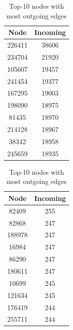 \documentclass[acmlarge]{acmart}
\begin{document}
  \begin{table}[h!]
    \centering
    \begin{minipage}{0.45\textwidth}
      \centering
      \begin{tabular}{|c|c|}
        \hline
        \textbf{Node} & \textbf{Incoming} \\ \hline
        226411 & 38606\\ \hline
        234704 & 21920\\ \hline
        105607 & 19457\\ \hline
        241454 & 19377\\ \hline
        167295  & 19003\\ \hline
        198090 & 18975\\ \hline
        81435 & 18970\\ \hline
        214128 & 18967\\ \hline
        38342 & 18958\\ \hline
        245659 & 18935\\ \hline
      \end{tabular}
      \caption{Top-10 nodes with most incoming edges}
    \end{minipage} \hspace{0.3cm}
    \begin{minipage}{0.45\textwidth}
      \centering
      \begin{tabular}{|c|c|}
        \hline
        \textbf{Node} & \textbf{Incoming} \\ \hline
        82409 & 255\\ \hline
        82868 & 247\\ \hline
        188978 & 247\\ \hline
        16984 & 247\\ \hline
        86290 & 247\\ \hline
        180611 & 247\\ \hline
        10699 & 245\\ \hline
        121634 & 245\\ \hline
        176419 & 244\\ \hline
        255711 & 244\\ \hline
      \end{tabular}
      \caption{Top-10 nodes with most outgoing edges}
    \end{minipage}
  \end{table}
\end{document}
